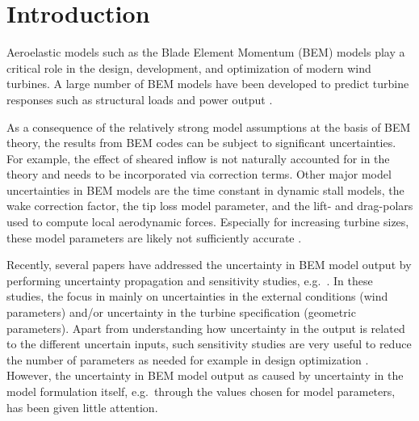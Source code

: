 \section{Introduction}
Aeroelastic models such as the Blade Element Momentum (BEM) models \cite{HandBook} play a critical role in the design, development, and optimization of modern wind turbines. A large number of BEM models have been developed to predict turbine responses such as structural loads and power output \cite{Vorpahl2013}. 

As a consequence of the relatively strong model assumptions at the basis of BEM theory, the results from BEM codes can be subject to significant uncertainties. For example, the effect of sheared inflow \cite{Madsen2012} is not naturally accounted for in the theory and needs to be incorporated via correction terms. Other major model uncertainties in BEM models are the time constant in dynamic stall models, the wake correction factor, the tip loss model parameter, and the lift- and drag-polars used to compute local aerodynamic forces. Especially for increasing turbine sizes, these model parameters are likely not sufficiently accurate \cite{Sayed2019}. 

Recently, several papers have addressed the uncertainty in BEM model output by performing uncertainty propagation and sensitivity studies, e.g.\ \cite{Echeverria2017,Matthaus2017,Murcia2018,Robertson2018,Bos2019c}. In these studies, the focus in mainly on uncertainties in the external conditions (wind parameters) and/or uncertainty in the turbine specification (geometric parameters). Apart from understanding how uncertainty in the output is related to the different uncertain inputs, such sensitivity studies are very useful to reduce the number of parameters as needed for example in design optimization \cite{Echeverria2017}. However, the uncertainty in BEM model output as caused by uncertainty in the model formulation itself, e.g.\ through the values chosen for model parameters, has been given little attention. %

